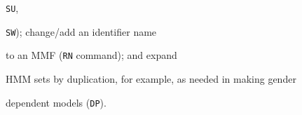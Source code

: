 \texttt{SU},


\texttt{SW}); change/add an identifier name


to an MMF (\texttt{RN} command); and expand


HMM sets by duplication, for example, as needed in making gender


dependent models (\texttt{DP}).
















